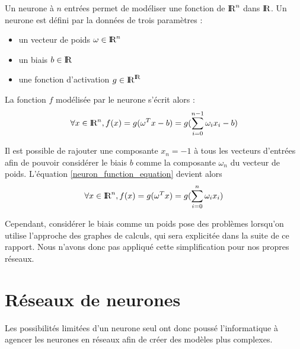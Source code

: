 \begin{definition}[Neurone] 
Un neurone à $n$ entrées permet de modéliser une fonction de $\textrm{I\kern-0.21emR}^n$ dans $\textrm{I\kern-0.21emR}$. Un neurone est défini par la données de trois paramètres :
  \begin{itemize}
    \item un vecteur de poids $\omega \in \textrm{I\kern-0.21emR}^n$
    \item un biais $b \in \textrm{I\kern-0.21emR}$
    \item une fonction d'activation $g \in \textrm{I\kern-0.21emR}^{\textrm{I\kern-0.21emR}}$
  \end{itemize}

La fonction $f$ modélisée par le neurone s'écrit alors : 
  \begin{equation}
\forall x \in \textrm{I\kern-0.21emR}^n, f(x) = g(\omega^{T}x - b) = g(\sum_{i=0}^{n-1}\omega_{i}x_{i} - b)
  \label{neuron_function_equation}
  \end{equation}
\end{definition}    
\begin{remark}[Biais]
Il est possible de rajouter une composante $x_{n} = -1$ à tous les vecteurs d'entrées afin de pouvoir considérer le biais $b$ comme la composante $\omega_n$ du vecteur de poids. L'équation \eqref{neuron_function_equation} devient alors
  \begin{equation}
\forall x \in \textrm{I\kern-0.21emR}^n, f(x) = g(\omega^{T}x) = g(\sum_{i=0}^{n}\omega_{i}x_{i})  
  \label{corrected_neuron_function_equation}
  \end{equation}

Cependant, considérer le biais comme un poids pose des problèmes lorsqu'on utilise l'approche des graphes de calculs, qui sera explicitée dans la suite de ce rapport. Nous n'avons donc pas appliqué cette simplification pour nos propres réseaux.

\end{remark}



\section{Réseaux de neurones}

Les possibilités limitées d'un neurone seul ont donc poussé l'informatique à agencer les neurones en réseaux afin de créer des modèles plus complexes. \\

